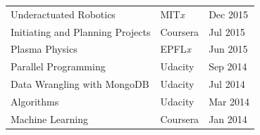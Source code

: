 \documentclass[letterpaper]{deedy-resume} %
\begin{document}
\begin{minipage}[t]{0.66\textwidth}
\begin{tabular}{lll}
 Underactuated Robotics & MIT{\it x} & Dec 2015 \\
 Initiating and Planning Projects & Coursera & Jul 2015 \\
 Plasma Physics & EPFL{\it x} & Jun 2015 \\
 Parallel Programming & Udacity & Sep 2014 \\
 Data Wrangling with MongoDB & Udacity & Jul 2014 \\
 Algorithms & Udacity & Mar 2014 \\
 Machine Learning & Coursera & Jan 2014 \\
\end{tabular}

\sectionspace %




\end{minipage} %








\end{document}
